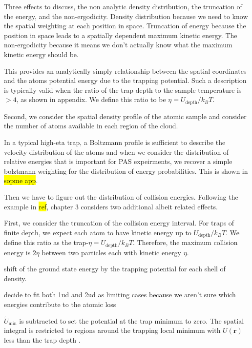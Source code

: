 Three effects to discuss, the non analytic density distribution, the truncation of the energy, and the non-ergodicity.
Density distribution because we need to know the spatial weighting at each position in space.
Truncation of energy because the position in space leads to a spatially dependent maximum kinetic energy.
The non-ergodicity because it means we don't actually know what the maximum kinetic energy should be.

This provides an analytically simply relationship between the spatial coordinates and the atoms potential energy due to the trapping potential.
Such a description is typically valid when the ratio of the trap depth to the sample temperature is $>4$, as shown in appendix.
We define this ratio to be $\eta = U_{\text{depth}}/k_B T$.

Second, we consider the spatial density profile of the atomic sample and consider the number of atoms available in each region of the cloud.


In a typical high-eta trap, a Boltzmann profile is sufficient to describe the velocity distribution of the atoms and when we consider the distribution of relative energies that is important for PAS expeirments, we recover a simple bolztmann weighting for the distribution of energy probabilities. 
This is shown in \hl{sopme app}.

Then we have to figure out the distribution of collision energies.
Following the example in \hl{ref}, chapter 3 considers two additional albeit related effects.

First, we consider the truncation of the collision energy interval.
For traps of finite depth, we expect each atom to have kinetic energy up to $U_{\text{depth}}/k_B T$.
We define this ratio as the trap-$\eta = U_{\text{depth}}/k_B T$.
Therefore, the maximum collision energy is $2\eta$ between two particles each with kinetic energy $\eta$.

shift of the ground state energy by the trapping potential for each shell of density.


decide to fit both 1ud and 2ud as limiting cases because we aren't sure which energies contribute to the atomic loss





$\tilde{U}_{\text{min}}$ is subtracted to set the potential at the trap minimum to zero. The spatial integral is restricted to regions around the trapping local minimum with $U(\mathbf{r})$ less than the trap depth \cite{ycm11}.

